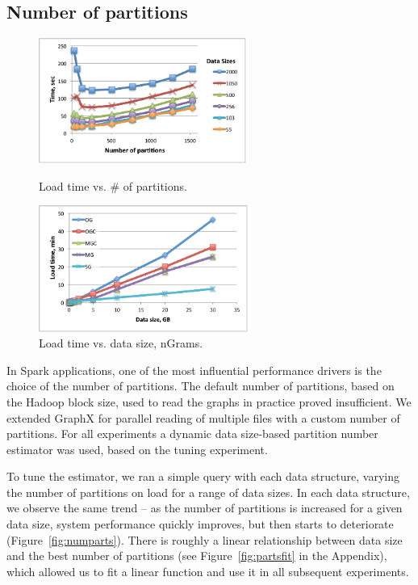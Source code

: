 \subsection{Number of partitions}

\begin{figure}[th!]
\centering
\begin{minipage}{3in}
  \centering
  \includegraphics[width=2.7in]{figs/numparts.pdf}
\vspace{-0.1in}
  \caption{Load time vs. \# of partitions.}
  \label{fig:numparts}
\vspace{-0.1in}
\end{minipage}
\begin{minipage}{3in}
  \centering
  \includegraphics[width=2.7in]{figs/tselect.pdf}
\vspace{-0.1in}
  \caption{Load time vs. data size, nGrams.}
  \label{fig:tselect}
\vspace{-0.1in}
\end{minipage}
\end{figure}

In Spark applications, one of the most influential performance drivers
is the choice of the number of partitions.  The default number of
partitions, based on the Hadoop block size, used to read the graphs in
practice proved insufficient.  We extended GraphX for parallel reading
of multiple files with a custom number of partitions.  For all
experiments a dynamic data size-based partition number estimator was
used, based on the tuning experiment.

To tune the estimator, we ran a simple  query with each
data structure, varying the number of partitions on load for a range
of data sizes.  In each data structure, we observe the same trend --
as the number of partitions is increased for a given data size, system
performance quickly improves, but then starts to deteriorate
(Figure~\ref{fig:numparts}).  There is roughly a linear relationship
between data size and the best number of partitions (see
Figure~\ref{fig:partsfit} in the Appendix), which allowed us to fit a
linear function and use it in all subsequent experiments.

